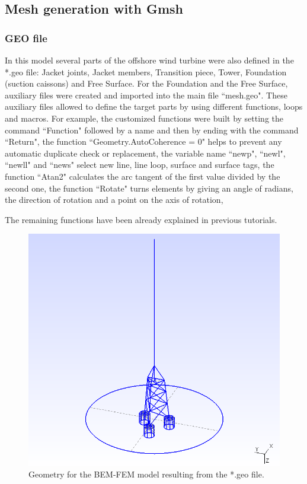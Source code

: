 \documentclass[a4]{article}
\begin{document}
\subsection{Mesh generation with Gmsh}

\subsubsection{GEO file}
In this model several parts of the offshore wind turbine were also defined in the *.geo file: Jacket joints, Jacket members, Transition piece, Tower, Foundation (suction caissons) and Free Surface. For the Foundation and the Free Surface, auxiliary files were created and imported into the main file ``mesh.geo". These auxiliary files allowed to define the target parts by using different functions, loops and macros. For example, the customized functions were built by setting the command ``Function" followed by a name and then by ending with the command ``Return", the function ``Geometry.AutoCoherence = 0" helps to prevent any automatic duplicate check or replacement, the variable name ``newp", ``newl", ``newll" and ``news" select new line, line loop, surface and surface tags, the function ``Atan2" calculates the arc tangent of the first value divided by the second one, the function ``Rotate" turns elements by giving an angle of radians, the direction of rotation and a point on the axis of rotation, 

The remaining functions have been already explained in previous tutorials.

\begin{figure}[tbh!]
	\centering
	\includegraphics[scale=0.6]{geo2.png}
	\caption{Geometry for the BEM-FEM model resulting from the *.geo file.}
	\label{fig:geo2}
\end{figure}
\end{document}
